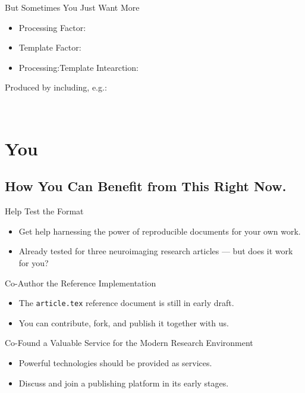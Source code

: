 			\begin{frame}[fragile]{But Sometimes You Just Want More}
				\centering
				\begin{itemize}
					\item Processing Factor: 
					\item Template Factor: 
					\item Processing:Template Intearction: 
				\end{itemize}
				\vspace{2em}

				\textcolor{lg}{Produced by including, e.g.:}
				\vspace{1em}

				\begin{minipage}{0.07\textwidth}~\end{minipage}
				\begin{minipage}{0.5\textwidth}
					\begin{pyverbatim}
					\end{pyverbatim}
				\end{minipage}
			\end{frame}
	\section{You}
		\subsection{How You Can Benefit from This Right Now.}
			\begin{frame}{Help Test the Format}
				\begin{itemize}
					\item Get help harnessing the power of reproducible documents for your own work.
					\item Already tested for three neuroimaging research articles --- but does it work for you?
				\end{itemize}
			\end{frame}
			\begin{frame}{Co-Author the Reference Implementation}
				\begin{itemize}
					\item The \colorbox{tlg}{\texttt{article.tex}} reference document is still in early draft.
					\item You can contribute, fork, and publish it together with us.
				\end{itemize}
			\end{frame}
			\begin{frame}{Co-Found a Valuable Service for the Modern Research Environment}
				\begin{itemize}
					\item Powerful technologies should be provided as services.
					\item Discuss and join a publishing platform in its early stages.
				\end{itemize}
			\end{frame}


